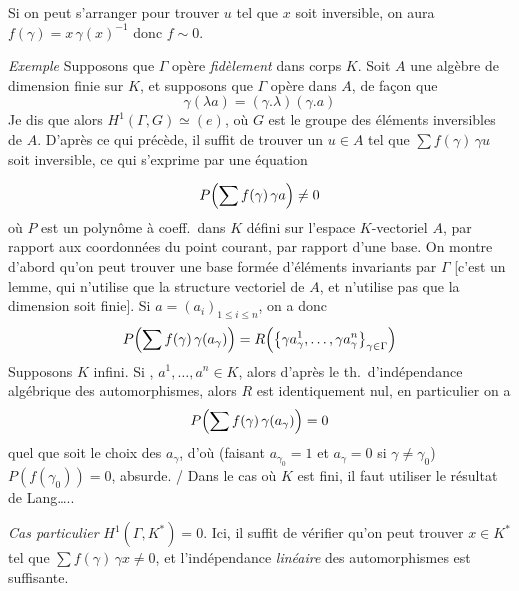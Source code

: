 \documentclass[11pt,a4paper]{article}
\begin{document}
Si on peut s'arranger pour trouver $u$ tel que $x$ soit inversible, on aura
$f(\gamma) = x\,\gamma(x)^{-1}$ donc $f \sim 0$.

\emph{Exemple} \quad Supposons que $\Gamma$  opère
\emph{fidèlement} dans  corps $K$. Soit $A$ une algèbre de
dimension finie sur $K$, et supposons que $\Gamma$ opère dans $A$, de façon
que
\[
  \gamma(\lambda a) = (\gamma.\lambda)(\gamma.a)
\]
Je dis que alors $H^1(\Gamma, G) \simeq (e)$, où $G$ est le groupe des
éléments inversibles de $A$. D'après ce qui précède,
il suffit de trouver un $u \in A$ tel que
$\sum f(\gamma)\,\gamma u$ soit inversible, ce qui s'exprime par une équation


\[
  P\Bigl(\sum f(\gamma)\,\gamma a\Bigr) \neq 0
\]
où $P$ est un polynôme à coeff.\ dans $K$ 
défini sur l'espace $K$-vectoriel $A$, par rapport aux coordonnées
\struck{\ill{}} du point courant, par rapport  d'une base. On
montre d'abord qu'on peut trouver une base formée d'éléments invariants par $\Gamma$
[c'est un lemme, qui n'utilise que la structure 
vectoriel \struck{\ill{}} de $A$, et n'utilise pas que la dimension soit
finie]. Si $a = (a_i)_{1 \leq i \leq n}$, on a donc
\[
  P\Bigl(\sum f(\gamma)\,\gamma(a_\gamma)\Bigr) =
  R\Bigl(\bigl\lbrace \gamma a^1_\gamma, \ldots, \gamma a^n_\gamma
  \bigr\rbrace_{\gamma \in \Gamma}\Bigr)
\]
Supposons $K$ infini. Si 
, 
$a^1, \ldots, a^n \in K$, alors d'après le th.\ d'indépendance algébrique des
automorphismes, alors $R$ est identiquement nul, en particulier on a
\[
  P\Bigl(\sum f(\gamma)\,\gamma(a_\gamma)\Bigr) = 0
\]
quel que soit le choix des $a_\gamma$, d'où
(faisant $a_{\gamma_0} = 1$ et $a_{\gamma} = 0$ si $\gamma \neq \gamma_0$)
$P(f(\gamma_0)) = 0$, absurde.
/ Dans le cas où $K$ est fini, il faut utiliser le résultat de Lang\ldots..


 \emph{Cas particulier} \quad $H^1(\Gamma, K^{*}) = 0$.
Ici, il suffit de vérifier qu'on peut trouver $x \in K^{*}$ tel que
$\sum f(\gamma)\,\gamma x \neq 0$, et l'indépendance \emph{linéaire} des
automorphismes est suffisante.
\end{document}
